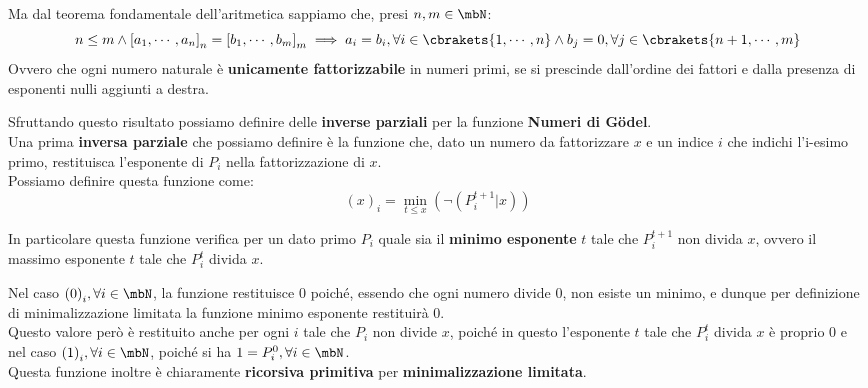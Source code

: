 Ma dal teorema fondamentale dell'aritmetica sappiamo che, presi \(n,m\in\mbN\):
\begin{equation}
  n\leq m \land {[a_1,\cdots,a_n]}_n={[b_1,\cdots,b_m]}_m \implies a_i=b_i, \forall i \in \cbrakets{1,\cdots,n} \land b_j=0, \forall j \in \cbrakets{n+1,\cdots,m}
\end{equation}
Ovvero che ogni numero naturale è \textbf{unicamente fattorizzabile} in numeri primi, se si prescinde dall'ordine dei fattori e dalla presenza di esponenti nulli aggiunti a destra.

Sfruttando questo risultato possiamo definire delle \textbf{inverse parziali} per la funzione \textbf{Numeri di Gödel}.\\
Una prima \textbf{inversa parziale} che possiamo definire è la funzione che, dato un numero da fattorizzare \(x\) e un indice \(i\) che indichi l'i-esimo primo, restituisca l'esponente di \(P_i\) nella fattorizzazione di \(x\).\\
Possiamo definire questa funzione come:
\begin{equation}
  {(x)}_i=\min_{t\leq x}(\neg(P_i^{t+1}\vert x))
\end{equation}

In particolare questa funzione verifica per un dato primo \(P_i\) quale sia il \textbf{minimo esponente} \(t\) tale che \(P_i^{t+1}\) non divida \(x\), ovvero il massimo esponente \(t\) tale che \(P_i^{t}\) divida \(x\).

Nel caso \({(0)}_i, \forall i \in \mbN\), la funzione restituisce \(0\) poiché, essendo che ogni numero divide \(0\), non esiste un minimo, e dunque per definizione di minimalizzazione limitata la funzione minimo esponente restituirà \(0\).\\
Questo valore però è restituito anche per ogni \(i\) tale che \(P_i\) non divide \(x\), poiché in questo l'esponente \(t\) tale che \(P_i^{t}\) divida \(x\) è proprio \(0\) e nel caso \({(1)}_i, \forall i \in \mbN\), poiché si ha \(1=P_i^0, \forall i \in \mbN\).\\
Questa funzione inoltre è chiaramente \textbf{ricorsiva primitiva} per \textbf{minimalizzazione limitata}.

